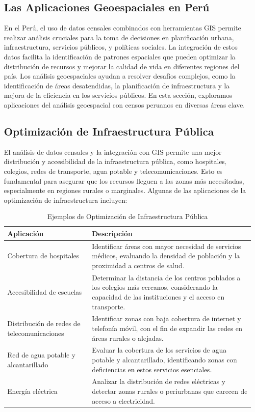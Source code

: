 \documentclass{article}
\begin{document}
{\subsection*{Las Aplicaciones Geoespaciales en Perú}
En el Perú, el uso de datos censales combinados con herramientas GIS permite realizar análisis cruciales para la toma de decisiones en planificación urbana, infraestructura, servicios públicos, y políticas sociales. La integración de estos datos facilita la identificación de patrones espaciales que pueden optimizar la distribución de recursos y mejorar la calidad de vida en diferentes regiones del país. Los análisis geoespaciales ayudan a resolver desafíos complejos, como la identificación de áreas desatendidas, la planificación de infraestructura y la mejora de la eficiencia en los servicios públicos. En esta sección, exploramos aplicaciones del análisis geoespacial con censos peruanos en diversas áreas clave.

\subsection*{Optimización de Infraestructura Pública}
El análisis de datos censales y la integración con GIS permite una mejor distribución y accesibilidad de la infraestructura pública, como hospitales, colegios, redes de transporte, agua potable y telecomunicaciones. Esto es fundamental para asegurar que los recursos lleguen a las zonas más necesitadas, especialmente en regiones rurales o marginales. Algunas de las aplicaciones de la optimización de infraestructura incluyen:

\begin{table}[ht]
	\centering
	\caption{Ejemplos de Optimización de Infraestructura Pública}
	\begin{tabularx}{\textwidth}{|l|X|}
		\hline
		\textbf{Aplicación} & \textbf{Descripción} \\
		\hline
		Cobertura de hospitales & Identificar áreas con mayor necesidad de servicios médicos, evaluando la densidad de población y la proximidad a centros de salud. \\
		\hline
		Accesibilidad de escuelas & Determinar la distancia de los centros poblados a los colegios más cercanos, considerando la capacidad de las instituciones y el acceso en transporte. \\
		\hline
		Distribución de redes de telecomunicaciones & Identificar zonas con baja cobertura de internet y telefonía móvil, con el fin de expandir las redes en áreas rurales o alejadas. \\
		\hline
		Red de agua potable y alcantarillado & Evaluar la cobertura de los servicios de agua potable y alcantarillado, identificando zonas con deficiencias en estos servicios esenciales. \\
		\hline
		Energía eléctrica & Analizar la distribución de redes eléctricas y detectar zonas rurales o periurbanas que carecen de acceso a electricidad. \\
		\hline
	\end{tabularx}
	\label{tab:infraestructura}
\end{table}

}
\end{document}
